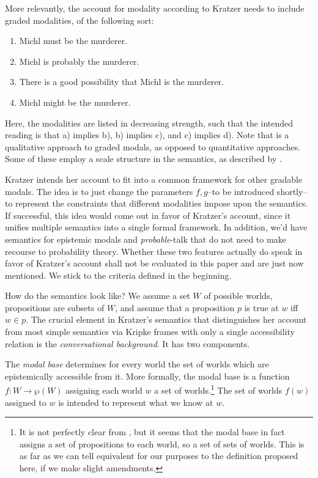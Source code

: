 \documentclass{article}
\theoremstyle{definition}
\begin{document}
More relevantly, the account for modality according to Kratzer needs to include graded modalities, of the following sort:
\begin{enumerate}[nosep,label=\alph*)]
  \item Michl must be the murderer.
  \item Michl is probably the murderer.
  \item There is a good possibility that Michl is the murderer.
  \item Michl might be the murderer.
\end{enumerate}
Here, the modalities are listed in decreasing strength, such that the intended reading is that a) implies b), b) implies c), and c) implies d).
Note that is a qualitative approach to graded modals, as opposed to quantitative approaches. Some of these employ a scale structure in the semantics, as described by \textcite{lassiter10_gradab}.

Kratzer intends her account to fit into a common framework for other gradable modals.
The idea is to just change the parameters $f,g$--to be introduced shortly--to represent the constraints that different modalities impose upon the semantics.
If successful, this idea would come out in favor of Kratzer's account, since it unifies multiple semantics into a single formal framework.
In addition, we'd have semantics for epistemic modals and \emph{probable}-talk that do not need to make recourse to probability theory.
Whether these two features actually do speak in favor of Kratzer's account shall not be evaluated in this paper and are just now mentioned.
We stick to the criteria defined in the beginning.

How do the semantics look like?
We assume a set $W$ of possible worlds, propositions are subsets of $W$, and assume that a proposition $p$ is true at $w$ iff $w \in p$.
The crucial element in Kratzer's semantics that distinguishes her account from most simple semantics via Kripke frames with only a single accessibility relation is the \emph{conversational background}.
It has two components.

The \emph{modal base} determines for every world the set of worlds which are epistemically accessible from it.
More formally, the modal base is a function $f: W \rightarrow \wp(W)$ assigning each world $w$ a set of worlds.\footnote{It is not perfectly clear from \textcite[][p.~644]{kratzer91_modal}, but it seems that the modal base in fact assigns a set of propositions to each world, so a set of sets of worlds. This is as far as we can tell equivalent for our purposes to the definition proposed here, if we make slight amendments.}
The set of worlds $f(w)$ assigned to $w$ is intended to represent what we know at $w$.
\end{document}
